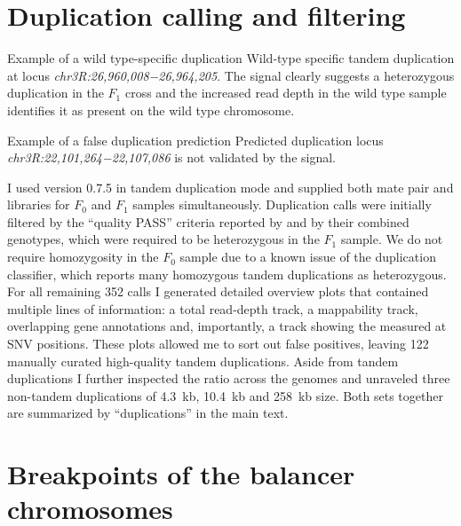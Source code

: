 \section{Duplication calling and filtering}
\label{sec:suppl_dup}

    {Example of a wild type-specific duplication}
    {Wild-type specific tandem duplication at locus
    \textit{chr3R:26,960,008−26,964,205}. The \baf signal
    clearly suggests a heterozygous duplication in the $F_1$ cross and the
    increased read depth in the wild type sample identifies it as present on
    the wild type chromosome.}

    {Example of a false duplication prediction}
    {Predicted duplication locus \textit{chr3R:22,101,264−22,107,086} is not
    validated by the \baf signal.}

I used \delly version 0.7.5 in tandem duplication mode and supplied both mate
pair and \wgs libraries for $F_0$ and $F_1$ samples simultaneously. Duplication
calls were initially filtered by the ``quality PASS'' criteria reported by
\delly and by their combined genotypes, which were required to be heterozygous
in the $F_1$ sample. We do not require homozygosity in the $F_0$ sample due to a
known issue of the duplication classifier, which reports many homozygous tandem
duplications as heterozygous. For all remaining 352 calls I generated detailed
overview plots that contained multiple lines of information: a total read-depth
track, a mappability track, overlapping gene annotations and, importantly, a
track showing the \baf measured at SNV positions. These plots
allowed me to sort out false positives, leaving 122 manually curated
high-quality tandem duplications. Aside from tandem duplications I further
inspected the \baf ratio across the genomes and unraveled three
non-tandem duplications of 4.3~kb, 10.4~kb and 258~kb size. Both sets together
are summarized by ``duplications'' in the main text.





\section{Breakpoints of the balancer chromosomes}
\label{sec:suppl_balancer_breakpoints}

